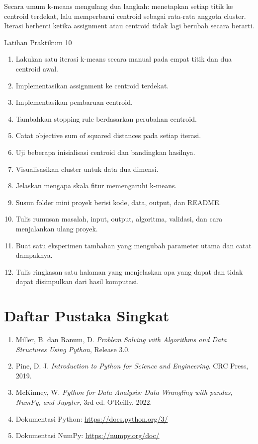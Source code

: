 \documentclass[11pt,a4paper]{report}
\begin{document}
Secara umum k-means mengulang dua langkah: menetapkan setiap titik ke centroid terdekat, lalu memperbarui centroid sebagai rata-rata anggota cluster. Iterasi berhenti ketika assignment atau centroid tidak lagi berubah secara berarti.

\begin{latihanbox}{Latihan Praktikum 10}
\begin{enumerate}
  \item Lakukan satu iterasi k-means secara manual pada empat titik dan dua centroid awal.
  \item Implementasikan assignment ke centroid terdekat.
  \item Implementasikan pembaruan centroid.
  \item Tambahkan stopping rule berdasarkan perubahan centroid.
  \item Catat objective sum of squared distances pada setiap iterasi.
  \item Uji beberapa inisialisasi centroid dan bandingkan hasilnya.
  \item Visualisasikan cluster untuk data dua dimensi.
  \item Jelaskan mengapa skala fitur memengaruhi k-means.
  \item Susun folder mini proyek berisi kode, data, output, dan README.
  \item Tulis rumusan masalah, input, output, algoritma, validasi, dan cara menjalankan ulang proyek.
  \item Buat satu eksperimen tambahan yang mengubah parameter utama dan catat dampaknya.
  \item Tulis ringkasan satu halaman yang menjelaskan apa yang dapat dan tidak dapat disimpulkan dari hasil komputasi.
\end{enumerate}
\end{latihanbox}

\chapter*{Daftar Pustaka Singkat}
\begin{enumerate}
  \item Miller, B. dan Ranum, D. \textit{Problem Solving with Algorithms and Data Structures Using Python}, Release 3.0.
  \item Pine, D. J. \textit{Introduction to Python for Science and Engineering}. CRC Press, 2019.
  \item McKinney, W. \textit{Python for Data Analysis: Data Wrangling with pandas, NumPy, and Jupyter}, 3rd ed. O'Reilly, 2022.
  \item Dokumentasi Python: \url{https://docs.python.org/3/}
  \item Dokumentasi NumPy: \url{https://numpy.org/doc/}
\end{enumerate}
\end{document}
